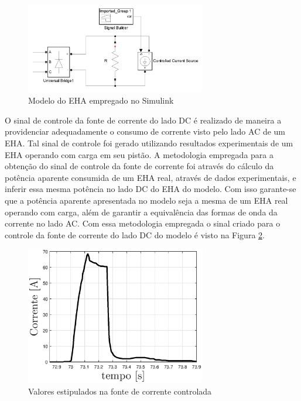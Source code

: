 \begin{figure}[!htb] %
	\centering
	\includegraphics[width=0.7\textwidth]{Cap4/Figuras/EHA.png}
	\caption{Modelo do EHA empregado no Simulink}
	\label{fig:EHA.png}
\end{figure}

O sinal de controle da fonte de corrente do lado DC é realizado de maneira a providenciar adequadamente o consumo de corrente visto pelo lado AC de um EHA. Tal sinal de controle foi gerado utilizando resultados experimentais de um EHA operando com carga em seu pistão. A metodologia empregada para a obtenção do sinal de controle da fonte de corrente foi através do cálculo da potência aparente consumida de um EHA real, através de dados experimentais, e inferir essa mesma potência no lado DC do EHA do modelo. Com isso garante-se que a potência aparente apresentada no modelo seja a mesma de um EHA real operando com carga, além de garantir a equivalência das formas de onda da corrente no lado AC. Com essa metodologia empregada o sinal criado para o controle da fonte de corrente do lado DC do modelo é visto na Figura \ref{fig:corrente_controlada_EHA.eps}.

\begin{figure}[!htb] %
	\centering
	\includegraphics[width=0.7\textwidth]{Cap4/Figuras/corrente_controlada_EHA.eps}
	\caption{Valores estipulados na fonte de corrente controlada}
	\label{fig:corrente_controlada_EHA.eps}
\end{figure}

